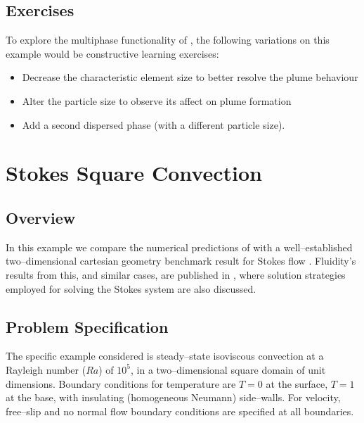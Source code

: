 \subsection{Exercises}
To explore the multiphase functionality of \fluidity, the following variations on this example would be constructive learning exercises:

\begin{itemize}
\item Decrease the characteristic element size to better resolve the plume behaviour
\item Alter the particle size to observe its affect on plume formation
\item Add a second dispersed phase (with a different particle size).
\end{itemize}


\section{Stokes Square Convection}
\label{sec:stokes_square_convection}

\subsection{Overview}

In this example we compare the numerical predictions of \fluidity{} with a well--established two--dimensional cartesian geometry benchmark result for Stokes flow \citep{blankenbach1989}. Fluidity's results from this, and similar cases, are published in \citet{Davies2011}, where solution strategies employed for solving the Stokes system are also discussed.


\subsection{Problem Specification}

The specific example considered is steady--state isoviscous convection at a Rayleigh number ($Ra$) of $10^{5}$, in a two--dimensional square domain of unit dimensions. Boundary conditions for temperature are $T=0$ at the surface, $T=1$ at the base, with insulating (homogeneous Neumann) side--walls. For velocity, free--slip and no normal flow boundary conditions are specified at all boundaries.

